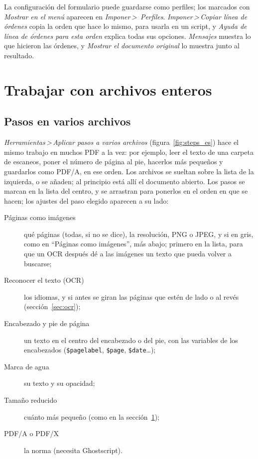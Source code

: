 \documentclass[12pt,
              article,
              oneside
              ]{memoir}
\newcommand*{\menu}[1]{\textit{#1}}
\newcommand*{\then}{\,>\,}
\begin{document}
%
La configuración del formulario puede guardarse como perfiles; los
marcados con \menu{Mostrar en el menú} aparecen en \menu{Imponer\then
Perfiles}. \menu{Imponer\then Copiar línea de órdenes} copia la orden que
hace lo mismo, para usarla en un script, y \menu{Ayuda de línea de órdenes
para esta orden} explica todas sus opciones. \menu{Mensajes} muestra lo que
hicieron las órdenes, y \menu{Mostrar el documento original} lo muestra
junto al resultado.

\section{Trabajar con archivos enteros}
\label{sec:files}

\subsection{Pasos en varios archivos}

%
\menu{Herramientas\then Aplicar pasos a varios archivos}
(figura~\ref{fig:steps_es}) hace el mismo trabajo en muchos PDF a la vez:
por ejemplo, leer el texto de una carpeta de escaneos, poner el número de
página al pie, hacerlos más pequeños y guardarlos como PDF/A, en ese orden.
Los archivos se sueltan sobre la lista de la izquierda, o se añaden; al
principio está allí el documento abierto. Los pasos se marcan en la lista
del centro, y se arrastran para ponerlos en el orden en que se hacen; los
ajustes del paso elegido aparecen a su lado:

\begin{description}
\item[Páginas como imágenes] qué páginas (todas, si no se dice), la
  resolución, PNG o JPEG, y si en gris, como en \enquote{Páginas como
  imágenes}, más abajo; primero en la lista, para que un OCR después dé a
  las imágenes un texto que pueda volver a buscarse;
\item[Reconocer el texto (OCR)] los idiomas, y si antes se giran las
  páginas que estén de lado o al revés (sección~\ref{sec:ocr});
\item[Encabezado y pie de página] un texto en el centro del encabezado o
  del pie, con las variables de los encabezados (\texttt{\$pagelabel},
  \texttt{\$page}, \texttt{\$date}\ldots);
\item[Marca de agua] su texto y su opacidad;
\item[Tamaño reducido] cuánto más pequeño (como en la
  sección~\ref{sec:files});
\item[PDF/A o PDF/X] la norma (necesita Ghostscript).
\end{description}
\end{document}
